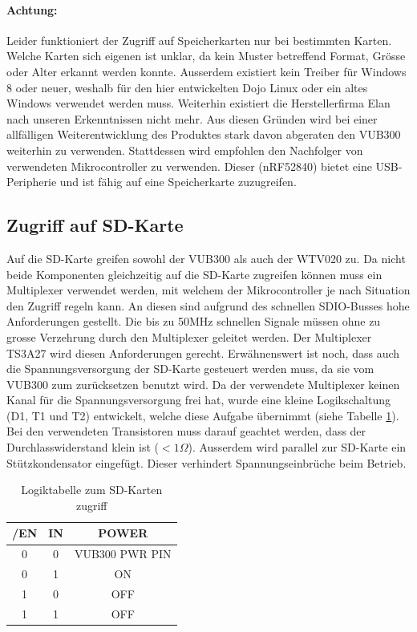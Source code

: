 \paragraph{Achtung:} Leider funktioniert der Zugriff auf Speicherkarten nur bei bestimmten Karten. 
Welche Karten sich eigenen ist unklar, da kein Muster betreffend Format, Grösse oder Alter erkannt werden konnte.
Ausserdem existiert kein Treiber für Windows 8 oder neuer, weshalb für den hier entwickelten Dojo Linux oder ein altes Windows verwendet werden muss.
Weiterhin existiert die Herstellerfirma Elan nach unseren Erkenntnissen nicht mehr. Aus diesen Gründen wird bei einer allfälligen Weiterentwicklung des Produktes stark davon abgeraten den VUB300 weiterhin zu verwenden.
Stattdessen wird empfohlen den Nachfolger von verwendeten Mikrocontroller zu verwenden. Dieser (nRF52840) bietet eine USB-Peripherie und ist fähig auf eine Speicherkarte zuzugreifen. 

\subsection{Zugriff auf SD-Karte}\label{sec:SD_KART}
Auf die SD-Karte greifen sowohl der VUB300 als auch der WTV020 zu. Da nicht beide Komponenten gleichzeitig auf die SD-Karte zugreifen können muss ein Multiplexer verwendet werden, mit welchem der Mikrocontroller je nach Situation den Zugriff regeln kann.
An diesen sind aufgrund des schnellen SDIO-Busses hohe Anforderungen gestellt. Die bis zu 50MHz schnellen Signale müssen ohne zu grosse Verzehrung durch den Multiplexer geleitet werden. Der Multiplexer TS3A27 wird diesen Anforderungen gerecht.
Erwähnenswert ist noch, dass auch die Spannungsversorgung der SD-Karte gesteuert werden muss, da sie vom VUB300 zum zurücksetzen benutzt wird. Da der verwendete Multiplexer keinen Kanal für die Spannungsversorgung frei hat, wurde eine kleine Logikschaltung (D1, T1 und T2) entwickelt, welche diese Aufgabe übernimmt (siehe Tabelle \ref{tab:zugriff}).
Bei den verwendeten Transistoren muss darauf geachtet werden, dass der Durchlasswiderstand klein ist (\(<1\Omega\)). Ausserdem wird parallel zur SD-Karte ein Stützkondensator eingefügt. Dieser verhindert Spannungseinbrüche beim Betrieb.

\vspace{1cm}

\begin{table}[h]
  \centering
  \begin{tabular}{|c|c|c|}
    \hline
    /EN & IN & POWER\\
    \hline
    0 & 0 & VUB300 PWR PIN \\
    \hline
    0 & 1 & ON \\
    \hline
    1 & 0 & OFF \\
    \hline
    1 & 1 & OFF \\
    \hline
  \end{tabular}
  \caption{Logiktabelle zum SD-Karten zugriff}\label{tab:zugriff}
\end{table}
 
